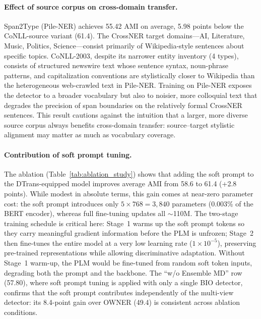 \documentclass[14pt]{extreport}
\begin{document}
\paragraph{Effect of source corpus on cross-domain transfer.}
Span2Type (Pile-NER) achieves 55.42 AMI on average, 5.98 points below the CoNLL-source variant (61.4). The CrossNER target domains---AI, Literature, Music, Politics, Science---consist primarily of Wikipedia-style sentences about specific topics. CoNLL-2003, despite its narrower entity inventory (4 types), consists of structured newswire text whose sentence syntax, noun-phrase patterns, and capitalization conventions are stylistically closer to Wikipedia than the heterogeneous web-crawled text in Pile-NER. Training on Pile-NER exposes the detector to a broader vocabulary but also to noisier, more colloquial text that degrades the precision of span boundaries on the relatively formal CrossNER sentences. This result cautions against the intuition that a larger, more diverse source corpus always benefits cross-domain transfer: source--target stylistic alignment may matter as much as vocabulary coverage.

\paragraph{Contribution of soft prompt tuning.}
The ablation (Table~\ref{tab:ablation_study}) shows that adding the soft prompt to the DTrans-equipped model improves average AMI from 58.6 to 61.4 (+2.8 points). While modest in absolute terms, this gain comes at near-zero parameter cost: the soft prompt introduces only $5 \times 768 = 3{,}840$ parameters (0.003\% of the BERT encoder), whereas full fine-tuning updates all $\sim$110M. The two-stage training schedule is critical here: Stage~1 warms up the soft prompt tokens so they carry meaningful gradient information before the PLM is unfrozen; Stage~2 then fine-tunes the entire model at a very low learning rate ($1\times10^{-5}$), preserving pre-trained representations while allowing discriminative adaptation. Without Stage~1 warm-up, the PLM would be fine-tuned from random soft token inputs, degrading both the prompt and the backbone. The ``w/o Ensemble MD'' row (57.80), where soft prompt tuning is applied with only a single BIO detector, confirms that the soft prompt contributes independently of the multi-view detector: its 8.4-point gain over OWNER (49.4) is consistent across ablation conditions.
\end{document}
